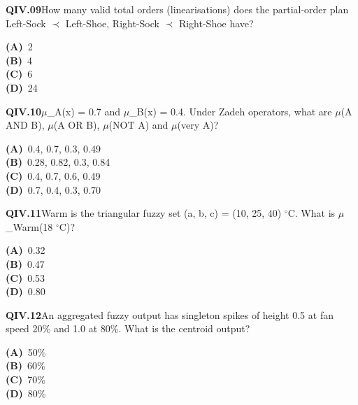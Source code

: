 \begin{tcolorbox}[enhanced,breakable,colback=white,colframe=navyL,arc=2mm,boxrule=0.7pt,left=3mm,right=3mm,top=2mm,bottom=2mm]
\textbf{\color{navy}QIV.09}\quad How many valid total orders (linearisations) does the partial-order plan Left-Sock $\prec$ Left-Shoe, Right-Sock $\prec$ Right-Shoe have?\hfill{}\par\smallskip
{\small \textbf{\color{navyL}(A)}\ 2\\[1pt]\textbf{\color{navyL}(B)}\ 4\\[1pt]\textbf{\color{navyL}(C)}\ 6\\[1pt]\textbf{\color{navyL}(D)}\ 24}
\end{tcolorbox}
\begin{tcolorbox}[enhanced,breakable,colback=white,colframe=navyL,arc=2mm,boxrule=0.7pt,left=3mm,right=3mm,top=2mm,bottom=2mm]
\textbf{\color{navy}QIV.10}\quad $\mu$\_A(x) = 0.7 and $\mu$\_B(x) = 0.4. Under Zadeh operators, what are $\mu$(A AND B), $\mu$(A OR B), $\mu$(NOT A) and $\mu$(very A)?\hfill{}\par\smallskip
{\small \textbf{\color{navyL}(A)}\ 0.4, 0.7, 0.3, 0.49\\[1pt]\textbf{\color{navyL}(B)}\ 0.28, 0.82, 0.3, 0.84\\[1pt]\textbf{\color{navyL}(C)}\ 0.4, 0.7, 0.6, 0.49\\[1pt]\textbf{\color{navyL}(D)}\ 0.7, 0.4, 0.3, 0.70}
\end{tcolorbox}
\begin{tcolorbox}[enhanced,breakable,colback=white,colframe=navyL,arc=2mm,boxrule=0.7pt,left=3mm,right=3mm,top=2mm,bottom=2mm]
\textbf{\color{navy}QIV.11}\quad Warm is the triangular fuzzy set (a, b, c) = (10, 25, 40) $^\circ$C. What is $\mu$\_Warm(18 $^\circ$C)?\hfill{}\par\smallskip
{\small \textbf{\color{navyL}(A)}\ 0.32\\[1pt]\textbf{\color{navyL}(B)}\ 0.47\\[1pt]\textbf{\color{navyL}(C)}\ 0.53\\[1pt]\textbf{\color{navyL}(D)}\ 0.80}
\end{tcolorbox}
\begin{tcolorbox}[enhanced,breakable,colback=white,colframe=navyL,arc=2mm,boxrule=0.7pt,left=3mm,right=3mm,top=2mm,bottom=2mm]
\textbf{\color{navy}QIV.12}\quad An aggregated fuzzy output has singleton spikes of height 0.5 at fan speed 20\% and 1.0 at 80\%. What is the centroid output?\hfill{}\par\smallskip
{\small \textbf{\color{navyL}(A)}\ 50\%\\[1pt]\textbf{\color{navyL}(B)}\ 60\%\\[1pt]\textbf{\color{navyL}(C)}\ 70\%\\[1pt]\textbf{\color{navyL}(D)}\ 80\%}
\end{tcolorbox}
